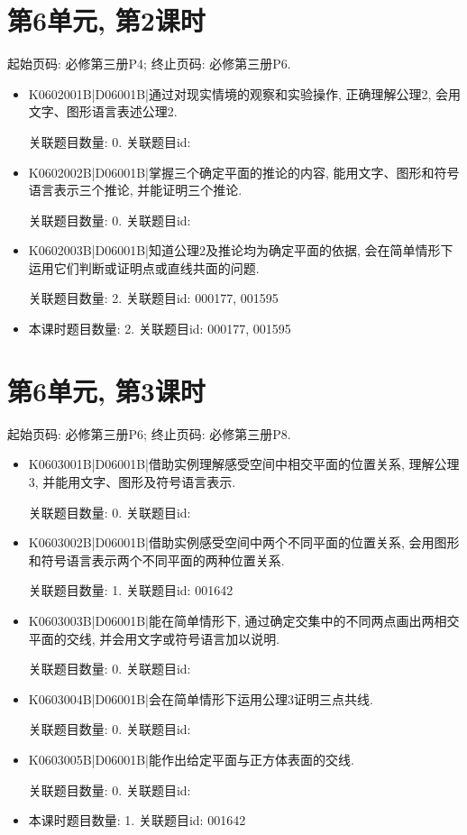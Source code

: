 \section*{第6单元, 第2课时}
起始页码: 必修第三册P4; 终止页码: 必修第三册P6.
\begin{itemize}
\item K0602001B|D06001B|通过对现实情境的观察和实验操作, 正确理解公理2, 会用文字、图形语言表述公理2.

关联题目数量: 0. 关联题目id: 

\item K0602002B|D06001B|掌握三个确定平面的推论的内容, 能用文字、图形和符号语言表示三个推论, 并能证明三个推论.

关联题目数量: 0. 关联题目id: 

\item K0602003B|D06001B|知道公理2及推论均为确定平面的依据, 会在简单情形下运用它们判断或证明点或直线共面的问题.

关联题目数量: 2. 关联题目id: 000177, 001595

\item 本课时题目数量: 2. 关联题目id: 000177, 001595

\end{itemize}

\section*{第6单元, 第3课时}
起始页码: 必修第三册P6; 终止页码: 必修第三册P8.
\begin{itemize}
\item K0603001B|D06001B|借助实例理解感受空间中相交平面的位置关系, 理解公理3, 并能用文字、图形及符号语言表示.

关联题目数量: 0. 关联题目id: 

\item K0603002B|D06001B|借助实例感受空间中两个不同平面的位置关系, 会用图形和符号语言表示两个不同平面的两种位置关系.

关联题目数量: 1. 关联题目id: 001642

\item K0603003B|D06001B|能在简单情形下, 通过确定交集中的不同两点画出两相交平面的交线, 并会用文字或符号语言加以说明.

关联题目数量: 0. 关联题目id: 

\item K0603004B|D06001B|会在简单情形下运用公理3证明三点共线.

关联题目数量: 0. 关联题目id: 

\item K0603005B|D06001B|能作出给定平面与正方体表面的交线.

关联题目数量: 0. 关联题目id: 

\item 本课时题目数量: 1. 关联题目id: 001642

\end{itemize}

